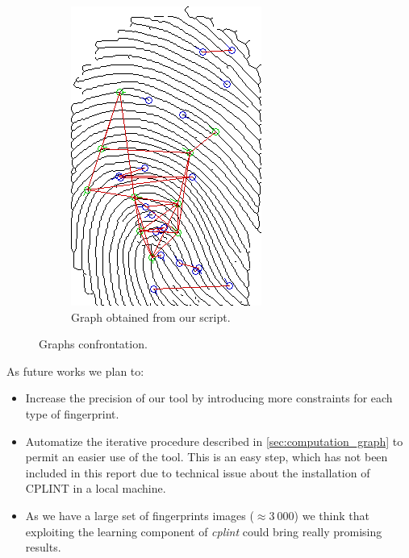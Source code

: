 \documentclass[8pt]{article}
\begin{document}
\begin{figure}
\begin{subfigure}{.48\textwidth}
		\includegraphics[width=0.86\linewidth]{img/plp-final}
		\caption{Graph obtained from our script.}
			\label{fig:concl-plp}
	\end{subfigure}%
	\caption{Graphs confrontation.}
	\label{fig:concl}
\end{figure}

As future works we plan to:
\begin{itemize}
	\item Increase the precision of our tool by introducing more constraints for each 
        type of fingerprint.
  \item Automatize the iterative procedure described in
        \cref{sec:computation_graph} to permit an easier use of the tool.
        This is an easy step, which has not been included in this report due
        to technical issue about the installation of CPLINT in a local machine.
	\item As we have a large set of fingerprints images ($\approx 3\ 000$) we think that 
        exploiting the learning component of \textit{cplint} could bring really promising results.
\end{itemize}
\end{document}
